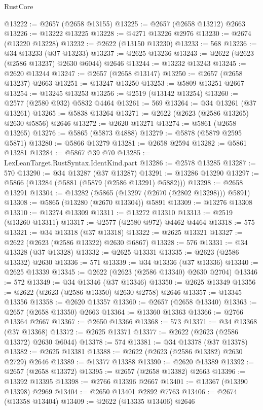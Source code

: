 \begin{lexlean}{RustCore}
\begin{coremodule}
@13222 := @2657 (@2658 @13155)
@13225 := @2657 (@2658 @13212) @2663
@13226 := @13222 @13225
@13228 := @4271 @13226 @2976
@13230 := @2674 (@13220 @13228)
@13232 := @2622 (@13150 @13230)
@13233 := 568
@13236 := @34 @13233 (@37 @13233)
@13237 := @2625 @13236
@13243 := @2622 (@2623 (@2586 @13237) @2630 @6044) @2646
@13244 := @13232 @13243
@13245 := @2620 @13244
@13247 := @2657 (@2658 @13147)
@13250 := @2657 (@2658 @13237) @2663
@13251 := @13247 @13250
@13253 := @5809 @13251 @2667
@13254 := @13245 @13253
@13256 := @2519 (@13142 @13254)
@13260 := @2577 (@2580 @932) @5832 @4464
@13261 := 569
@13264 := @34 @13261 (@37 @13261)
@13265 := @5838 @13264
@13271 := @2622 (@2623 (@2586 @13265) @2630 @5856) @2646
@13272 := @2620 @13271
@13274 := @5861 (@2658 @13265)
@13276 := @5865 (@5873 @4888)
@13279 := @5878 (@5879 @2595 @5871)
@13280 := @5866 @13279
@13281 := @2658 @2594
@13282 := @5861 @13281
@13284 := @5867 @39 @70
@13285 := LexLeanTarget.RustSyntax.IdentKind.part
@13286 := @2578 @13285
@13287 := 570
@13290 := @34 @13287 (@37 @13287)
@13291 := @13286 @13290
@13297 := @5866 (@13284 (@5881 (@5879 (@2586 @13291) @5882)))
@13298 := @2658 @13291
@13304 := @13282 (@5865 (@13297 (@2670 (@2802 @13298))) @5891)
@13308 := @5865 (@13280 (@2670 @13304)) @5891
@13309 := @13276 @13308
@13310 := @13274 @13309
@13311 := @13272 @13310
@13313 := @2519 (@13260 @13311)
@13317 := @2577 (@2580 @972) @4462 @4464
@13318 := 575
@13321 := @34 @13318 (@37 @13318)
@13322 := @2625 @13321
@13327 := @2622 (@2623 (@2586 @13322) @2630 @6867)
@13328 := 576
@13331 := @34 @13328 (@37 @13328)
@13332 := @2625 @13331
@13335 := @2623 (@2586 @13332) @2630
@13336 := 571
@13339 := @34 @13336 (@37 @13336)
@13340 := @2625 @13339
@13345 := @2622 (@2623 (@2586 @13340) @2630 @2704)
@13346 := 572
@13349 := @34 @13346 (@37 @13346)
@13350 := @2625 @13349
@13356 := @2622 (@2623 (@2586 @13350) @2630 @2758) @2646
@13357 := @13345 @13356
@13358 := @2620 @13357
@13360 := @2657 (@2658 @13340)
@13363 := @2657 (@2658 @13350) @2663
@13364 := @13360 @13363
@13366 := @2766 @13364 @2667
@13367 := @2650 @13366
@13368 := 573
@13371 := @34 @13368 (@37 @13368)
@13372 := @2625 @13371
@13377 := @2622 (@2623 (@2586 @13372) @2630 @6044)
@13378 := 574
@13381 := @34 @13378 (@37 @13378)
@13382 := @2625 @13381
@13388 := @2622 (@2623 (@2586 @13382) @2630 @2729) @2646
@13389 := @13377 @13388
@13390 := @2620 @13389
@13392 := @2657 (@2658 @13372)
@13395 := @2657 (@2658 @13382) @2663
@13396 := @13392 @13395
@13398 := @2766 @13396 @2667
@13401 := @13367 (@13390 @13398) @2969
@13404 := @2650 @13401 @2892 @7763
@13406 := @2674 (@13358 @13404)
@13409 := @2622 (@13335 @13406) @2646

\end{coremodule}
\end{lexlean}
